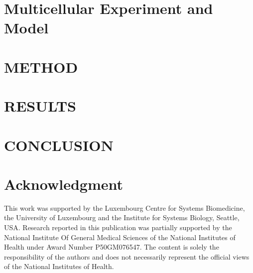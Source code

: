 \documentclass[conference]{IEEEtran}
\begin{document}
\section{Multicellular Experiment and Model}




\section{METHOD}





\section{RESULTS}








\section{CONCLUSION}





\section*{Acknowledgment}

This work was supported by the Luxembourg Centre for Systems Biomedicine, the University of Luxembourg and the Institute for Systems Biology, Seattle, USA. Research reported in this publication was partially supported by the National Institute Of General Medical Sciences of the National Institutes of Health under Award Number P50GM076547. The content is solely the responsibility of the authors and does not necessarily represent the official views of the National Institutes of Health.




\begin{small}




\end{small}
\end{document}
